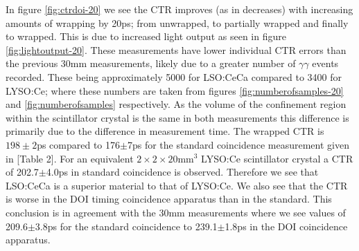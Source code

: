 In figure \ref{fig:ctrdoi-20} we see the CTR improves (as in decreases) with increasing amounts of wrapping by 20ps; from unwrapped, to partially wrapped and finally to wrapped. This is due to increased light output as seen in figure \ref{fig:lightoutput-20}. These measurements have lower individual CTR errors than the previous 30mm measurements, likely due to a greater number of $\gamma\gamma$ events recorded. These being approximately 5000 for LSO:CeCa compared to 3400 for LYSO:Ce; where these numbers are taken from figures \ref{fig:numberofsamples-20} and \ref{fig:numberofsamples} respectively. As the volume of the confinement region within the scintillator crystal is the same in both measurements this difference is primarily due to the difference in measurement time. The wrapped CTR is $198\pm2$ps compared to 176$\pm$7ps for the standard coincidence measurement given in [Table 2]\cite{uffray_Jarron_Meyer_Lecoq_2014}. For an equivalent $2\times2\times20$mm$^3$ LYSO:Ce scintillator crystal a CTR of 202.7$\pm$4.0ps in standard coincidence is observed. Therefore we see that LSO:CeCa is a superior material to that of LYSO:Ce. We also see that the CTR is worse in the DOI timing coincidence apparatus than in the standard. This conclusion is in agreement with the 30mm measurements where we see values of 209.6$\pm$3.8ps for the standard coincidence to 239.1$\pm$1.8ps in the DOI coincidence apparatus.